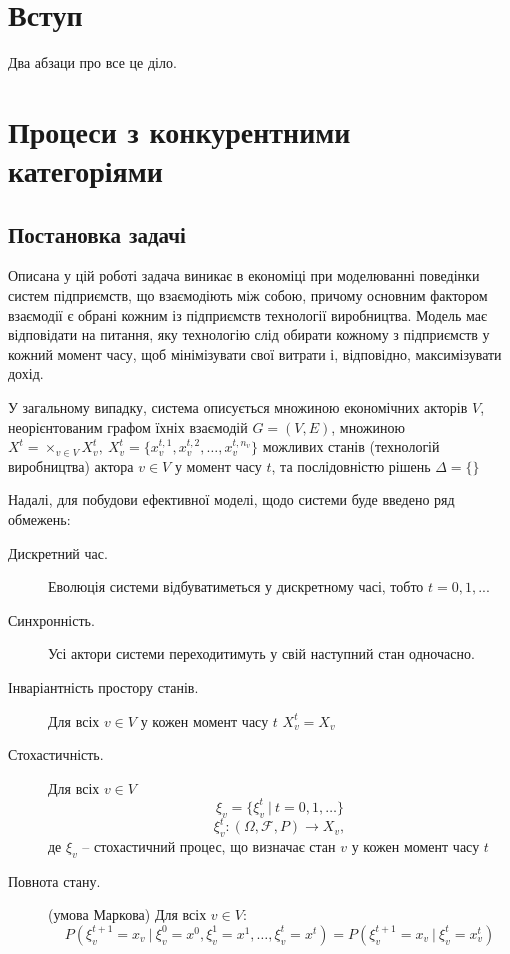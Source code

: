 \documentclass[oneside,draft,14pt]{extarticle}
\begin{document}

\setcounter{page}{2}

\tableofcontents
\clearpage

\section{Вступ}

Два абзаци про все це діло.

\section{Процеси з конкурентними категоріями}

\subsection{Постановка задачі}

Описана у цій роботі задача виникає в економіці\cite{David:1998} при моделюванні поведінки систем підприємств, що взаємодіють між собою, причому основним фактором взаємодії є обрані кожним із підприємств технології виробництва. Модель має відповідати на питання, яку технологію слід обирати кожному з підприємств у кожний момент часу, щоб мінімізувати свої витрати і, відповідно, максимізувати дохід. 

У загальному випадку, система описується\cite{Chornei:2005} множиною економічних акторів \(V\), неорієнтованим графом їхніх взаємодій \(G = (V, E)\), множиною \(X^t = \times_{v \in V}X_v^t,\ X_v^t = \{x^{t,1}_v, x^{t,2}_v, \ldots, x^{t,n_v}_v\}\) можливих станів (технологій виробництва) актора \(v \in V\) у момент часу \(t\), та послідовністю рішень \(\Delta = \{\}\)

Надалі, для побудови ефективної моделі, щодо системи буде введено ряд обмежень:
\begin{description} 
	\item[Дискретний час.] Еволюція системи відбуватиметься у дискретному часі, тобто \(t = 0, 1, ...\)
	\item[Синхронність.] Усі актори системи переходитимуть у свій наступний стан одночасно.
	\item[Інваріантність простору станів.] Для всіх \(v \in V\) у кожен момент часу \(t\) \(X_v^t = X_v\)
	\item[Стохастичність.] Для всіх \(v \in V\)
	\[ \xi_v = \{\xi^t_v\ |\ t = 0, 1, \ldots \}\] \[ \xi_v^t : (\Omega, \mathcal{F}, P) \rightarrow X_v,\] 
	де \( \xi_v \) – стохастичний процес, що визначає стан \(v\) у кожен момент часу \(t\)
	\item[Повнота стану.] (умова Маркова) Для всіх \(v \in V\):
	\[P(\xi_v^{t+1} = x_v\ |\ \xi_v^0 = x^0, \xi_v^1 = x^1, \ldots, \xi_v^t = x^t) = P(\xi_v^{t+1} = x_v\ |\ \xi_v^t = x_v^t )\]
\end{description}
\end{document}
